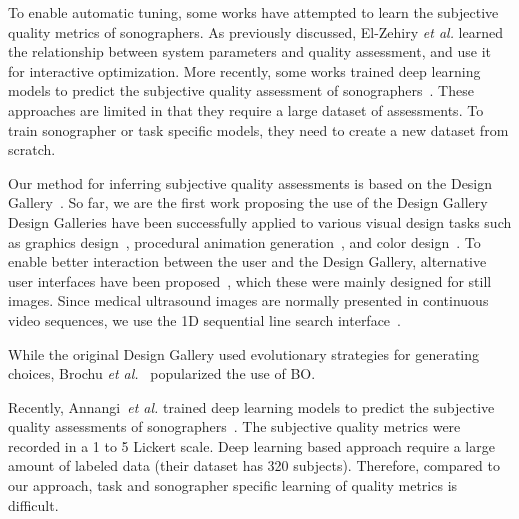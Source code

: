To enable automatic tuning, some works have attempted to learn the subjective quality metrics of sonographers.
As previously discussed, El-Zehiry \textit{et al.} learned the relationship between system parameters and quality assessment, and use it for interactive optimization.
More recently, some works trained deep learning models to predict the subjective quality assessment of sonographers~\cite{abdi_automatic_2017, annangi_ai_2020}.
These approaches are limited in that they require a large dataset of assessments.
To train sonographer or task specific models, they need to create a new dataset from scratch.

Our method for inferring subjective quality assessments is based on the Design Gallery~\cite{10.1145/258734.258887}.
So far, we are the first work proposing the use of the Design Gallery 
Design Galleries have been successfully applied to various visual design tasks such as graphics design~\cite{10.1145/258734.258887}, procedural animation generation~\cite{brochu_bayesian_2010}, and color design~\cite{phan_color_2018}.
To enable better interaction between the user and the Design Gallery, alternative user interfaces have been proposed~\cite{phan_color_2018, 10.1145/3072959.3073598, koyama_sequential_2020}, which these were mainly designed for still images.
Since medical ultrasound images are normally presented in continuous video sequences, we use the 1D sequential line search interface~\cite{10.1145/3072959.3073598}.

While the original Design Gallery used evolutionary strategies for generating choices, Brochu \textit{et al.}~\cite{NIPS2007_b6a1085a, brochu_bayesian_2010} popularized the use of BO. 




Recently, Annangi~\textit{et al.} trained deep learning models to predict the subjective quality assessments of sonographers~\cite{annangi_ai_2020}.
The subjective quality metrics were recorded in a 1 to 5 Lickert scale.
Deep learning based approach require a large amount of labeled data (their dataset has 320 subjects).
Therefore, compared to our approach, task and sonographer specific learning of quality metrics is difficult.


